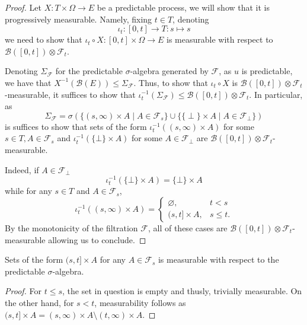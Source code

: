 \begin{proof}\leanok
Let $X : T \times \Omega \to E$ be a predictable process, we will show that it is progressively measurable. Namely, fixing $t \in T$, denoting
$$\iota_t : [0, t] \to T : s \mapsto s$$
we need to show that $\iota_t \circ X : [0, t] \times \Omega \to E$ is measurable with respect to $\mathcal{B}([0, t]) \otimes \mathcal{F}_t$.

Denoting $\Sigma_{\mathcal{F}}$ for the predictable $\sigma$-algebra generated by $\mathcal{F}$, as $u$ is predictable, we have that $X^{-1}(\mathcal{B}(E)) \le \Sigma_{\mathcal{F}}$. Thus, to show that $\iota_t \circ X$ is $\mathcal{B}([0, t]) \otimes \mathcal{F}_t$-measurable, it suffices to show that $\iota_t^{-1}(\Sigma_{\mathcal{F}}) \le \mathcal{B}([0, t]) \otimes \mathcal{F}_t$. In particular, as
$$\Sigma_{\mathcal{F}} = \sigma(\{(s, \infty) \times A \mid A \in \mathcal{F}_s\} \cup \{\{\perp\} \times A \mid A \in \mathcal{F}_\perp\})$$
is suffices to show that sets of the form $\iota_t^{-1}((s, \infty) \times A)$ for some $s \in T, A \in \mathcal{F}_s$ and $\iota_t^{-1}(\{\bot\} \times A)$ for some $A \in \mathcal{F}_\bot$ are $\mathcal{B}([0, t]) \otimes \mathcal{F}_t$-measurable.

Indeed, if $A \in \mathcal{F}_\bot$
$$\iota_t^{-1}(\{\bot\} \times A) = \{\bot\} \times A$$
while for any $s \in T$ and $A \in \mathcal{F}_s$,
$$\iota_t^{-1}((s, \infty) \times A) = \begin{cases}
    \varnothing, & t < s\\
    (s, t] \times A, & s \le t.
\end{cases}$$
By the monotonicity of the filtration $\mathcal{F}$, all of these cases are $\mathcal{B}([0, t]) \otimes \mathcal{F}_t$-measurable allowing us to conclude.
\end{proof}


\begin{lemma}\label{lem:predictable_Ioc_prod}
  \mathlibok
Sets of the form $(s, t] \times A$ for any $A \in \mathcal{F}_s$ is measurable with respect to the predictable $\sigma$-algebra.
\end{lemma}

\begin{proof}\leanok
For $t \le s$, the set in question is empty and thusly, trivially measurable. On the other hand, for $s < t$, measurability follows as
$(s, t] \times A = (s, \infty) \times A \setminus (t, \infty) \times A$.
\end{proof}



